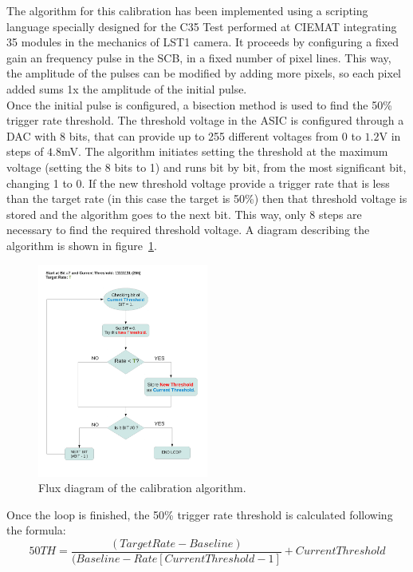 \documentclass[a4paper,10pt]{book}
\begin{document}
The algorithm for this calibration has been implemented using a scripting language specially designed for the C35 Test performed at CIEMAT integrating 35 modules in 
the mechanics of LST1 camera. It proceeds by configuring a fixed gain an frequency pulse in the SCB, in a fixed number of pixel lines. This way, the amplitude of the pulses
can be modified by adding more pixels, so each pixel added sums 1x the amplitude of the initial pulse. \\
Once the initial pulse is configured, a bisection method is used to find the 50\% trigger rate threshold. The threshold voltage in the ASIC is configured through a DAC with 8 bits, that can 
provide up to 255 different voltages from 0 to $1.2$V in steps of $4.8$mV. The algorithm initiates setting the threshold at the maximum voltage (setting the 8 bits to 1) 
and runs bit by bit, from the most significant bit, changing 1 to 0. If the new threshold voltage provide a trigger rate that is less than the target rate (in this case
the target is 50\%) then that threshold voltage is stored and the algorithm goes to the next bit. This way, only 8 steps are necessary to find the required threshold voltage.
A diagram describing the algorithm is shown in figure~\ref{fig:calalgorith}.
\begin{figure}
\centering
 \includegraphics[width=0.5\textwidth]{./calibrationalgorithm.pdf}
  \caption{Flux diagram of the calibration algorithm.}
    \label{fig:calalgorith}
\end{figure}

Once the loop is finished, the 50\% trigger rate threshold is calculated following the formula:
\begin{equation}
50TH = \frac{(Target Rate-Baseline)}{(Baseline-Rate[Current Threshold-1]} + Current Threshold 
\end{equation}
 
\end{document}
